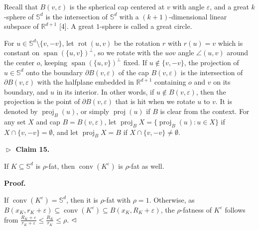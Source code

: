 \par
\par
Recall that $B(v,\varepsilon)$ is the spherical cap centered at $v$ with angle $\varepsilon$, and a great $k$-sphere of $\mathbb{S}^{d}$ is the intersection of $\mathbb{S}^{d}$ with a $(k+1)$-dimensional linear subspace of $\mathbb{R}^{d+1}$ [4]. A great $1$-sphere is called a great circle.
\par
\par
For $u\in\mathbb{S}^{d}\setminus\{v,-v\}$, let $\operatorname{rot}(u,v)$ be the rotation $r$ with $r(u)=v$ which is constant on $\operatorname{span}(\{u,v\})^{\perp}$, so we rotate with the $uov$ angle $\angle(u,v)$ around the center $o$, keeping $\operatorname{span}(\{u,v\})^{\perp}$ fixed. If $u\notin\{v,-v\}$, the projection of $u\in\mathbb{S}^{d}$ onto the boundary $\partial B(v,\varepsilon)$ of the cap $B(v,\varepsilon)$ is the intersection of $\partial B(v,\varepsilon)$ with the halfplane embedded in $\mathbb{R}^{d+1}$ containing $o$ and $v$ on its boundary, and $u$ in its interior. In other words, if $u\not\in B(v,\varepsilon)$, then the projection is the point of $\partial B(v,\varepsilon)$ that is hit when we rotate $u$ to $v$. It is denoted by $\operatorname{proj}_{B}(u)$, or simply $\operatorname{proj}(u)$ if $B$ is clear from the context. For any set $X$ and cap $B=B(v,\varepsilon)$, let $\operatorname{proj}_{B}X=\{\operatorname{proj}_{B}(u):u\in X\}$ if $X\cap\{v,-v\}=\emptyset$, and let $\operatorname{proj}_{B}X=B$ if $X\cap\{v,-v\}\neq\emptyset$.
\par
\par
\par\medskip\noindent\textbf{$\vartriangleright$ Claim 15.}\par
If $K\subseteq\mathbb{S}^{d}$ is $\rho$-fat, then $\operatorname{conv}(K^{\varepsilon})$ is $\rho$-fat as well.
\par
\par
\par
\par\medskip\noindent\textbf{Proof.}\par
If $\operatorname{conv}(K^{\varepsilon})=\mathbb{S}^{d}$, then it is $\rho$-fat with $\rho=1$. Otherwise, as $B(x_{K},r_{K}+\varepsilon)\subseteq\operatorname{conv}(K^{\varepsilon})%
\subseteq B(x_{K},R_{K}+\varepsilon)$, the $\rho$-fatness of $K^{\varepsilon}$ follows from $\frac{R_{K}+\varepsilon}{r_{K}+\varepsilon}\leq\frac{R_{K}}{r_{K}}\leq\rho$. $\hfill\vartriangleleft$
